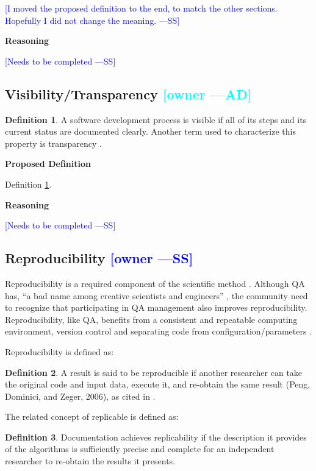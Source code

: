 \documentclass[letterpaper,cleveref]{lipics-v2019}
\newcommand{\authornote}[3]{\textcolor{#1}{[#3 ---#2]}}
\newcommand{\authornote}[3]{}
\newcommand{\wss}[1]{\authornote{blue}{SS}{#1}} %
\newcommand{\ad}[1]{\authornote{cyan}{AD}{#1}} %
\theoremstyle{definition}
\newtheorem{defn}{Definition}
\begin{document}
\wss{I moved the proposed definition to the end, to match the other sections.
  Hopefully I did not change the meaning.}

\noindent \textbf{Reasoning}

\wss{Needs to be completed}

\subsection{Visibility/Transparency \ad{owner}}

\begin{defn}
\label{VisibilitySelected}
A software development process is visible if all of its steps and its current
status are documented clearly. Another term used to characterize this property
is transparency \citep{ghezzi1991fundamentals}.
\end{defn}
      
\noindent \textbf{Proposed Definition} 

Definition \ref{VisibilitySelected}.

\noindent \textbf{Reasoning}

\wss{Needs to be completed}

\subsection{Reproducibility \wss{owner}}

Reproducibility is a required component of the scientific
method \citep{Davison2012}.  Although QA has, ``a bad name among creative
scientists and engineers'' \citep[p.~352]{Roache1998}, the community need to
recognize that participating in QA management also improves reproducibility.
Reproducibility, like QA, benefits from a consistent and repeatable computing
environment, version control and separating code from
configuration/parameters \citep{Davison2012}.

Reproducibility is defined as:

\begin{defn}
A result is said to be reproducible if another researcher can take the original
code and input data, execute it, and re-obtain the same result (Peng, Dominici,
and Zeger, 2006), as cited in \citet{BenureauAndRougier2017}.
\end{defn}

The related concept of replicable is defined as:

\begin{defn}
Documentation achieves replicability if the description it provides of the
algorithms is sufficiently precise and complete for an independent researcher to
re-obtain the results it presents.  \citep{BenureauAndRougier2017}
\end{defn}
\end{document}

